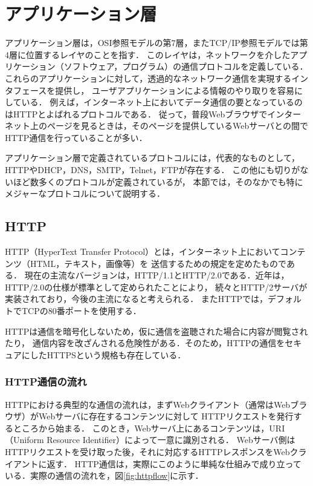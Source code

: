 \section{アプリケーション層}
アプリケーション層は，OSI参照モデルの第7層，またTCP/IP参照モデルでは第4層に位置するレイヤのことを指す．
このレイヤは，ネットワークを介したアプリケーション（ソフトウェア，プログラム）の通信プロトコルを定義している．
これらのアプリケーションに対して，透過的なネットワーク通信を実現するインタフェースを提供し，
ユーザアプリケーションによる情報のやり取りを容易にしている．
例えば，インターネット上においてデータ通信の要となっているのはHTTPとよばれるプロトコルである．
従って，普段Webブラウザでインターネット上のページを見るときは，そのページを提供しているWebサーバとの間で
HTTP通信を行っていることが多い．

アプリケーション層で定義されているプロトコルには，代表的なものとして，HTTPやDHCP，DNS，SMTP，Telnet，FTPが存在する．
この他にも切りがないほど数多くのプロトコルが定義されているが，
本節では，そのなかでも特にメジャーなプロトコルについて説明する．

\subsection{HTTP}
HTTP（HyperText Transfer Protocol）とは，インターネット上においてコンテンツ（HTML，テキスト，画像等）を
送信するための規定を定めたものである．
現在の主流なバージョンは，HTTP/1.1とHTTP/2.0である．近年は，HTTP/2.0の仕様が標準として定められたことにより，
続々とHTTP/2サーバが実装されており，今後の主流になると考えられる．
またHTTPでは，デフォルトでTCPの80番ポートを使用する．

HTTPは通信を暗号化しないため，仮に通信を盗聴された場合に内容が閲覧されたり，
通信内容を改ざんされる危険性がある．そのため，HTTPの通信をセキュアにしたHTTPSという規格も存在している．

\subsubsection{HTTP通信の流れ}
HTTPにおける典型的な通信の流れは，まずWebクライアント（通常はWebブラウザ）がWebサーバに存在するコンテンツに対して
HTTPリクエストを発行するところから始まる．
このとき，Webサーバ上にあるコンテンツは，URI（Uniform Resource Identifier）によって一意に識別される．
Webサーバ側はHTTPリクエストを受け取った後，それに対応するHTTPレスポンスをWebクライアントに返す．
HTTP通信は，実際にこのように単純な仕組みで成り立っている．実際の通信の流れを，図\ref{fig:httpflow}に示す．

